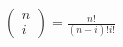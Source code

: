  \begin {align}[] \left (\begin {matrix}n\\i\end {matrix}\right ) = \frac {n!}{(n-i)! i!} \end {align} 
